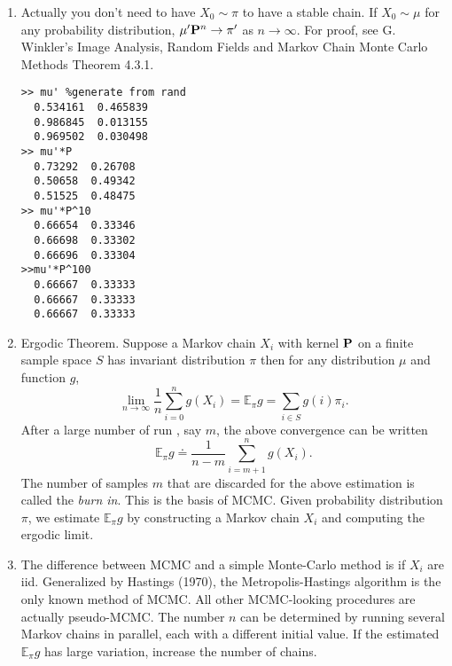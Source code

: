 \documentclass[12pt,twocolumn]{article} %
\begin{document}
\begin{enumerate}
\item Actually you don't need to have $X_0 \sim \pi$ to have a stable chain. If $X_0 \sim \mu$ for any probability distribution, $\mu'{\bf P}^n \to \pi'$ as $n \to \infty$. For proof, see G. Winkler's Image Analysis, Random Fields and Markov Chain Monte Carlo Methods Theorem 4.3.1.
\begin{verbatim}
>> mu' %generate from rand
  0.534161  0.465839
  0.986845  0.013155
  0.969502  0.030498
>> mu'*P
  0.73292  0.26708
  0.50658  0.49342
  0.51525  0.48475
>> mu'*P^10
  0.66654  0.33346
  0.66698  0.33302
  0.66696  0.33304
>>mu'*P^100
  0.66667  0.33333
  0.66667  0.33333
  0.66667  0.33333
\end{verbatim}
\item Ergodic Theorem. Suppose a Markov chain $X_i$ with kernel ${\bf P}$ on a finite sample space $S$ has invariant distribution $\pi$ then for any distribution $\mu$ and function $g$, 
$$\lim_{n \to \infty} \frac{1}{n}\sum_{i=0}^n g(X_i) = \mathbb{E}_{\pi} g = \sum_{i \in S} g(i)\pi_i.$$
After a large number of run , say $m$, the above convergence can be written
$$\mathbb{E}_{\pi} g \doteq \frac{1}{n-m}\sum_{i=m+1}^n g(X_i).$$
The number of samples $m$ that are discarded for the above estimation is called the {\em burn in}. This is the basis of MCMC. Given probability distribution $\pi$, we estimate $\mathbb{E}_{\pi} g$ by constructing a Markov chain $X_i$ and computing the ergodic limit. 

\item The difference between MCMC and a simple Monte-Carlo method is if $X_i$ are iid. Generalized by Hastings (1970), the Metropolis-Hastings algorithm is the only known method of MCMC. All other MCMC-looking procedures are actually pseudo-MCMC. The number $n$ can be determined by running several Markov chains in parallel, each with a different initial value. If the estimated $\mathbb{E}_{\pi} g$ has large variation, increase the number of chains. 
\end{enumerate}
\end{document}
